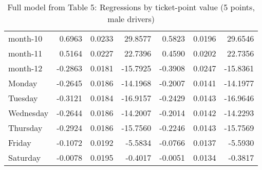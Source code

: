\documentclass[10pt]{article}
\begin{document}
\begin{table}[ht]
\begin{tabular}{lrrrrrr}
  month-10 & 0.6963 & 0.0233 & 29.8577 & 0.5823 & 0.0196 & 29.6546 \\ 
  month-11 & 0.5164 & 0.0227 & 22.7396 & 0.4590 & 0.0202 & 22.7356 \\ 
  month-12 & -0.2863 & 0.0181 & -15.7925 & -0.3908 & 0.0247 & -15.8361 \\ 
  Monday & -0.2645 & 0.0186 & -14.1968 & -0.2007 & 0.0141 & -14.1977 \\ 
  Tuesday & -0.3121 & 0.0184 & -16.9157 & -0.2429 & 0.0143 & -16.9646 \\ 
  Wednesday & -0.2644 & 0.0186 & -14.2007 & -0.2014 & 0.0142 & -14.2293 \\ 
  Thursday & -0.2924 & 0.0186 & -15.7560 & -0.2246 & 0.0143 & -15.7569 \\ 
  Friday & -0.1072 & 0.0192 & -5.5834 & -0.0766 & 0.0137 & -5.5930 \\ 
  Saturday & -0.0078 & 0.0195 & -0.4017 & -0.0051 & 0.0134 & -0.3817 \\ 
   \hline
\end{tabular}
\caption{Full model from Table 5: Regressions by ticket-point value (5 points, male drivers)} 
\label{tab_5_5_pts_no_age_M}
\end{table}


\clearpage
\pagebreak



\end{document}
